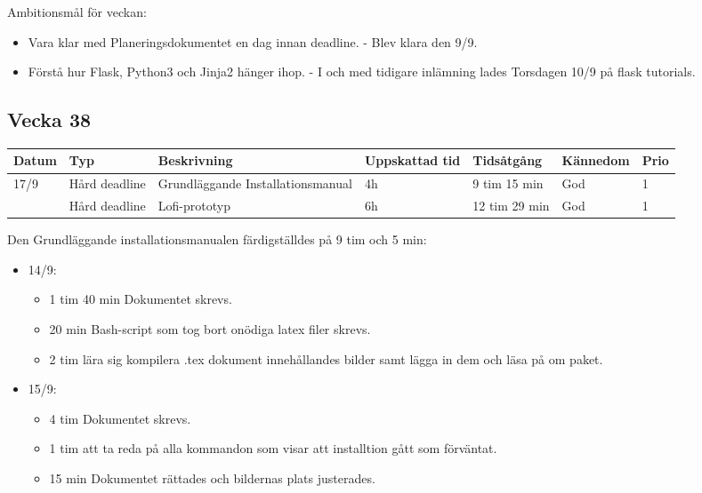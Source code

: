 \documentclass{TDP003mall}
\begin{document}
      Ambitionsmål för veckan:
      \begin{itemize}
      \item Vara klar med Planeringsdokumentet en dag innan deadline. - Blev klara den 9/9.
      \item Förstå hur Flask, Python3 och Jinja2 hänger ihop. - I och med tidigare inlämning lades Torsdagen 10/9 på flask tutorials.
      \end{itemize}
      

\newpage


\subsection{Vecka 38}
\begin{tabularx}{\linewidth}{|l|l|X|l|l|l|l|}
	\hline
	Datum & Typ           & Beskrivning                       & Uppskattad tid & Tidsåtgång    & Kännedom & Prio \\ [0.5ex]
	\hline                                                    
	17/9  & Hård deadline & Grundläggande Installationsmanual & 4h             & 9 tim 15 min  & God      & 1    \\
	\hline                                                    
          & Hård deadline & Lofi-prototyp                     & 6h             & 12 tim 29 min & God      & 1    \\
	\hline
\end{tabularx}

Den Grundläggande installationsmanualen färdigställdes på 9 tim och 5 min:
\begin{itemize}
	\item 14/9:
	\begin{itemize}
		\item 1 tim 40 min Dokumentet skrevs.
		\item 20 min Bash-script som tog bort onödiga latex filer skrevs.
		\item 2 tim lära sig kompilera .tex dokument innehållandes bilder samt lägga in dem och läsa på om paket.
	\end{itemize}
	\item 15/9:
	\begin{itemize}
		\item 4 tim Dokumentet skrevs.
		\item 1 tim att ta reda på alla kommandon som visar att installtion gått som förväntat.
		\item 15 min Dokumentet rättades och bildernas plats justerades.\\
	\end{itemize}
\end{itemize}
\end{document}
